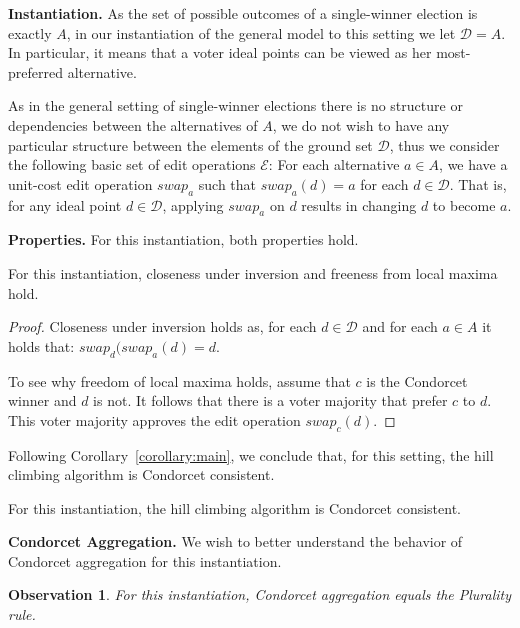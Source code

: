 \documentclass[sigconf]{aamas}  %
\newtheorem{observation}{Observation}
\newcommand{\mypara}[1]{\smallskip\noindent\textbf{#1.}}
\newcommand{\calD}{\mathcal{D}}
\newcommand{\calE}{\mathcal{E}}
\begin{document}
\mypara{Instantiation}
%
As the set of possible outcomes of a single-winner election is exactly $A$, in our instantiation of the general model to this setting we let $\calD = A$.
In particular, it means that a voter ideal points can be viewed as her most-preferred alternative.

As in the general setting of single-winner elections there is no structure or dependencies between the alternatives of $A$,
we do not wish to have any particular structure between the elements of the ground set $\calD$,
thus we consider the following basic set of edit operations $\calE$:
  For each alternative $a \in A$, we have a unit-cost edit operation $swap_a$ such that
  $swap_a(d) = a$ for each $d \in \calD$.
That is, for any ideal point $d \in \calD$, applying $swap_a$ on $d$ results in changing $d$ to become $a$.


\mypara{Properties}
%
For this instantiation, both properties hold.

\begin{lemma}
  For this instantiation, closeness under inversion and freeness from local maxima hold.
\end{lemma}

\begin{proof}
%
Closeness under inversion holds as, for each $d \in \calD$ and for each $a \in A$ it holds that:
  $swap_d(swap_a(d) = d$.

To see why freedom of local maxima holds, assume that $c$ is the Condorcet winner and $d$ is not.
It follows that there is a voter majority that prefer $c$ to $d$. This voter majority approves the edit operation $swap_c(d)$.
%
\end{proof}

Following Corollary~\ref{corollary:main}, we conclude that, for this setting, the hill climbing algorithm is Condorcet consistent.

\begin{corollary}
  For this instantiation, the hill climbing algorithm is Condorcet consistent.
\end{corollary}


\mypara{Condorcet Aggregation}
%
We wish to better understand the behavior of Condorcet aggregation for this instantiation.

\begin{observation}
  For this instantiation, Condorcet aggregation equals the Plurality rule.
\end{observation}
\end{document}

